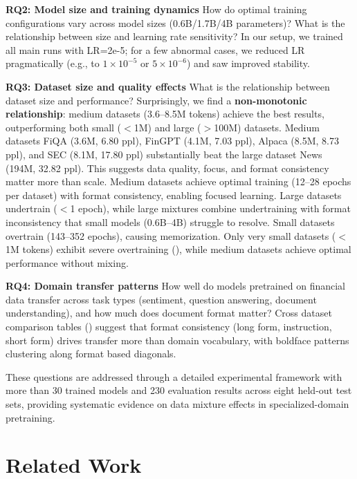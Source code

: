 \textbf{RQ2: Model size and training dynamics}
How do optimal training configurations vary across model sizes (0.6B/1.7B/4B parameters)? What is the relationship between size and learning rate sensitivity? In our setup, we trained all main runs with LR=2e-5; for a few abnormal cases, we reduced LR pragmatically (e.g., to $1\times10^{-5}$ or $5\times10^{-6}$) and saw improved stability.

\textbf{RQ3: Dataset size and quality effects}
What is the relationship between dataset size and performance? Surprisingly, we find a \textbf{non-monotonic relationship}: medium datasets (3.6–8.5M tokens) achieve the best results, outperforming both small ($<$1M) and large ($>$100M) datasets. Medium datasets FiQA (3.6M, 6.80 ppl), FinGPT (4.1M, 7.03 ppl), Alpaca (8.5M, 8.73 ppl), and SEC (8.1M, 17.80 ppl) substantially beat the large dataset News (194M, 32.82 ppl). This suggests data quality, focus, and format consistency matter more than scale. Medium datasets achieve optimal training (12–28 epochs per dataset) with format consistency, enabling focused learning. Large datasets undertrain ($<$1 epoch), while large mixtures combine undertraining with format inconsistency that small models (0.6B–4B) struggle to resolve. Small datasets overtrain (143–352 epochs), causing memorization. Only very small datasets ($<$1M tokens) exhibit severe overtraining (), while medium datasets achieve optimal performance without mixing.

\textbf{RQ4: Domain transfer patterns}
How well do models pretrained on financial data transfer across task types (sentiment, question answering, document understanding), and how much does document format matter? Cross dataset comparison tables () suggest that format consistency (long form, instruction, short form) drives transfer more than domain vocabulary, with boldface patterns clustering along format based diagonals.

These questions are addressed through a detailed experimental framework with more than 30 trained models and 230 evaluation results across eight held-out test sets, providing systematic evidence on data mixture effects in specialized-domain pretraining.

\section{Related Work}

